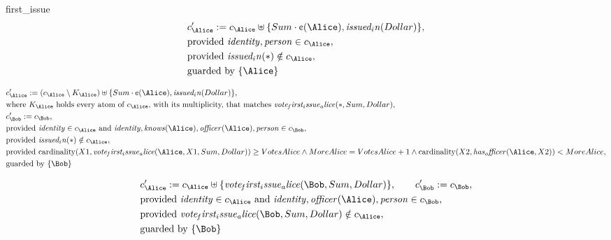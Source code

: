 first_issue
\fi
\begin{align*}
&
c'_
{
\Alice
}
 := 
c_
{
\Alice
}
 \uplus 
\{
Sum
\cdot
\text{\textcent}
(
\Alice
)
,
\mathit{
issued_in
}
(
Dollar
)
\}
,\\
&
\text{provided } 
\mathit{
identity
}
,
\mathit{
person
}
 \in c_
{
\Alice
}
,\\
&
\text{provided } 
\mathit{
issued_in
}
(
\ast
)
 \notin c_
{
\Alice
}
,\\
&
\text{guarded by } \{
\Alice
\}
\end{align*}

\begin{align*}
&
c'_
{
\Alice
}
 := 
(
c_
{
\Alice
}
 \setminus K_
{
\Alice
}
) \uplus 
\{
Sum
\cdot
\text{\textcent}
(
\Alice
)
,
\mathit{
issued_in
}
(
Dollar
)
\}
,\\
&
\text{where } K_
{
\Alice
}
 \text{ holds every atom of } c_
{
\Alice
}
 \text{, with its multiplicity, that matches } 
\mathit{
vote_first_issue_alice
}
(
\ast
,
Sum
,
Dollar
)
,\\
&
c'_
{
\Bob
}
 := 
c_
{
\Bob
}
,\\
&
\text{provided } 
\mathit{
identity
}
 \in c_
{
\Alice
}
 \text{ and } 
\mathit{
identity
}
,
\mathit{
knows
}
(
\Alice
)
,
\mathit{
officer
}
(
\Alice
)
,
\mathit{
person
}
 \in c_
{
\Bob
}
,\\
&
\text{provided } 
\mathit{
issued_in
}
(
\ast
)
 \notin c_
{
\Alice
}
,\\
&
\text{provided } 
\mathrm{cardinality}(
X1
,
\mathit{
vote_first_issue_alice
}
(
\Alice
,
X1
,
Sum
,
Dollar
)
)
\ge
VotesAlice
\land
MoreAlice
=
VotesAlice
+
1
\land
\mathrm{cardinality}(
X2
,
\mathit{
has_officer
}
(
\Alice
,
X2
)
)
<
MoreAlice
,\\
&
\text{guarded by } \{
\Bob
\}
\end{align*}

\begin{align*}
&
c'_
{
\Alice
}
 := 
c_
{
\Alice
}
 \uplus 
\{
\mathit{
vote_first_issue_alice
}
(
\Bob
,
Sum
,
Dollar
)
\}
, \qquad 
c'_
{
\Bob
}
 := 
c_
{
\Bob
}
,\\
&
\text{provided } 
\mathit{
identity
}
 \in c_
{
\Alice
}
 \text{ and } 
\mathit{
identity
}
,
\mathit{
officer
}
(
\Alice
)
,
\mathit{
person
}
 \in c_
{
\Bob
}
,\\
&
\text{provided } 
\mathit{
vote_first_issue_alice
}
(
\Bob
,
Sum
,
Dollar
)
 \notin c_
{
\Alice
}
,\\
&
\text{guarded by } \{
\Bob
\}
\end{align*}
